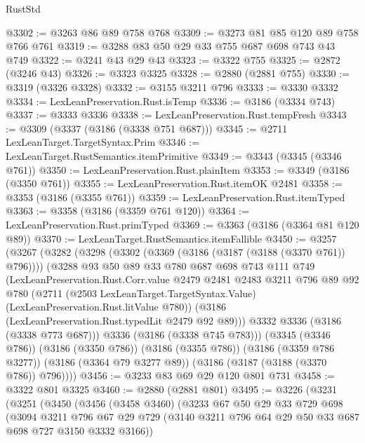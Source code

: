 \begin{lexlean}{RustStd}
\begin{coremodule}
{\begin{coremodule}
{{{{{{{{{{{{{{{{{{{{@3302 := @3263 @86 @89 @758 @768
@3309 := @3273 @81 @85 @120 @89 @758 @766 @761
@3319 := @3288 @83 @50 @29 @33 @755 @687 @698 @743 @43 @749
@3322 := @3241 @43 @29 @43
@3323 := @3322 @755
@3325 := @2872 (@3246 @43)
@3326 := @3323 @3325
@3328 := @2880 (@2881 @755)
@3330 := @3319 (@3326 @3328)
@3332 := @3155 @3211 @796
@3333 := @3330 @3332
@3334 := LexLeanPreservation.Rust.isTemp
@3336 := @3186 (@3334 @743)
@3337 := @3333 @3336
@3338 := LexLeanPreservation.Rust.tempFresh
@3343 := @3309 (@3337 (@3186 (@3338 @751 @687)))
@3345 := @2711 LexLeanTarget.TargetSyntax.Prim
@3346 := LexLeanTarget.RustSemantics.itemPrimitive
@3349 := @3343 (@3345 (@3346 @761))
@3350 := LexLeanPreservation.Rust.plainItem
@3353 := @3349 (@3186 (@3350 @761))
@3355 := LexLeanPreservation.Rust.itemOK @2481
@3358 := @3353 (@3186 (@3355 @761))
@3359 := LexLeanPreservation.Rust.itemTyped
@3363 := @3358 (@3186 (@3359 @761 @120))
@3364 := LexLeanPreservation.Rust.primTyped
@3369 := @3363 (@3186 (@3364 @81 @120 @89))
@3370 := LexLeanTarget.RustSemantics.itemFallible
@3450 := @3257
    (@3267
      (@3282
        (@3298
          (@3302 (@3369 (@3186 (@3187 (@3188 (@3370 @761)) @796))))
          (@3288
            @93
            @50
            @89
            @33
            @780
            @687
            @698
            @743
            @111
            @749
            (LexLeanPreservation.Rust.Corr.value
              @2479
              @2481
              @2483
              @3211
              @796
              @89
              @92
              @780
              (@2711
                (@2503 LexLeanTarget.TargetSyntax.Value)
                (LexLeanPreservation.Rust.litValue @780))
              (@3186 (LexLeanPreservation.Rust.typedLit @2479 @92 @89)))
            @3332
            @3336
            (@3186 (@3338 @773 @687)))
          @3336
          (@3186 (@3338 @745 @783)))
        (@3345 (@3346 @786))
        (@3186 (@3350 @786))
        (@3186 (@3355 @786))
        (@3186 (@3359 @786 @3277))
        (@3186 (@3364 @79 @3277 @89))
        (@3186 (@3187 (@3188 (@3370 @786)) @796))))
@3456 := @3233 @83 @69 @29 @120 @801 @731
@3458 := @3322 @801 @3325
@3460 := @2880 (@2881 @801)
@3495 := @3226
    (@3231
      (@3251
        (@3450
          (@3456
            (@3458 @3460)
            (@3233
              @67
              @50
              @29
              @33
              @729
              @698
              (@3094
                @3211
                @796
                @67
                @29
                @729
                (@3140 @3211 @796 @64 @29 @50 @33 @687 @698 @727 @3150 @3332 @3166))
}}}}}}}}}}}}}}}}}}}}
\end{coremodule}}
\end{coremodule}
\end{lexlean}
